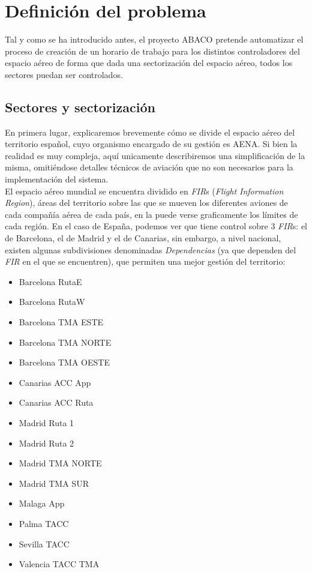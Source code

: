 \graphicspath{{capitulos/Capitulo2-Definicion-del-problema/recursos/}}

\section{Definición del problema} \label{apartado:2}

Tal y como se ha introducido antes, el proyecto ABACO pretende automatizar el proceso de creación de un horario de trabajo para
los distintos controladores del espacio aéreo de forma que dada una sectorización del espacio aéreo, todos los sectores puedan ser
controlados.

\subsection{Sectores y sectorización}
En primera lugar, explicaremos brevemente cómo se divide el espacio aéreo del territorio español, cuyo organismo encargado de su gestión es AENA. Si bien la realidad es muy compleja, aquí unicamente describiremos una simplificación de la misma, omitiéndose detalles técnicos de aviación que no son necesarios para la implementación del sistema.
\\

El espacio aéreo mundial se encuentra dividido en \textit{FIR}s (\textit{Flight Information Region}), áreas del territorio sobre las que se mueven los diferentes aviones de cada compañía aérea de cada país, en la  puede verse graficamente los límites de cada región. En el caso de España, podemos ver que tiene control sobre 3 \textit{FIR}s: el de Barcelona, el de Madrid y el de Canarias, sin embargo, a nivel nacional, existen algunas subdivisiones denominadas \textit{Dependencias} (ya que dependen del \textit{FIR} en el que se encuentren), que permiten una mejor gestión del territorio:
\begin{itemize}
	\item Barcelona RutaE
	\item Barcelona RutaW
	\item Barcelona TMA ESTE
	\item Barcelona TMA NORTE
	\item Barcelona TMA OESTE
	\item Canarias ACC App
	\item Canarias ACC Ruta
	\item Madrid Ruta 1
	\item Madrid Ruta 2
	\item Madrid TMA NORTE
	\item Madrid TMA SUR
	\item Malaga App
	\item Palma TACC
	\item Sevilla TACC
	\item  Valencia TACC TMA
\end{itemize}

